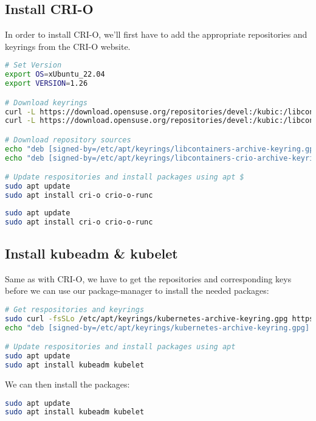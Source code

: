 \subsection{Install CRI-O}

In order to install CRI-O, we'll first have to add the appropriate repositories and keyrings from the CRI-O website.

\begin{lstlisting}[language=bash,caption=Add CRI-O repositories]
# Set Version
export OS=xUbuntu_22.04
export VERSION=1.26

# Download keyrings
curl -L https://download.opensuse.org/repositories/devel:/kubic:/libcontainers:/stable/$OS/Release.key | sudo gpg --dearmor -o /etc/apt/keyrings/libcontainers-archive-keyring.gpg
curl -L https://download.opensuse.org/repositories/devel:/kubic:/libcontainers:/stable:/cri-o:/$VERSION/$OS/Release.key | sudo gpg --dearmor -o /etc/apt/keyrings/libcontainers-crio-archive-keyring.gpg

# Download repository sources
echo "deb [signed-by=/etc/apt/keyrings/libcontainers-archive-keyring.gpg] https://download.opensuse.org/repositories/devel:/kubic:/libcontainers:/stable/$OS/ /" | sudo tee /etc/apt/sources.list.d/devel:kubic:libcontainers:stable.list
echo "deb [signed-by=/etc/apt/keyrings/libcontainers-crio-archive-keyring.gpg] https://download.opensuse.org/repositories/devel:/kubic:/libcontainers:/stable:/cri-o:/$VERSION/$OS/ /" | sudo tee /etc/apt/sources.list.d/devel:kubic:libcontainers:stable:cri-o:$VERSION.list

# Update respositories and install packages using apt $
sudo apt update
sudo apt install cri-o crio-o-runc 
\end{lstlisting}

\begin{lstlisting}[language=bash] 
sudo apt update
sudo apt install cri-o crio-o-runc 
\end{lstlisting}

\subsection{Install kubeadm \& kubelet}
Same as with CRI-O, we have to get the repositories and corresponding keys before we can use our package-manager to install the needed packages:

\begin{lstlisting}[language=bash] 
# Get respositories and keyrings
sudo curl -fsSLo /etc/apt/keyrings/kubernetes-archive-keyring.gpg https://packages.cloud.google.com/apt/doc/apt-key.gpg
echo "deb [signed-by=/etc/apt/keyrings/kubernetes-archive-keyring.gpg] https://apt.kubernetes.io/ kubernetes-xenial main" | sudo tee /etc/apt/sources.list.d/kubernetes.list

# Update respositories and install packages using apt
sudo apt update
sudo apt install kubeadm kubelet
\end{lstlisting}
We can then install the packages:
\begin{lstlisting}[language=bash] 
sudo apt update
sudo apt install kubeadm kubelet
\end{lstlisting}

